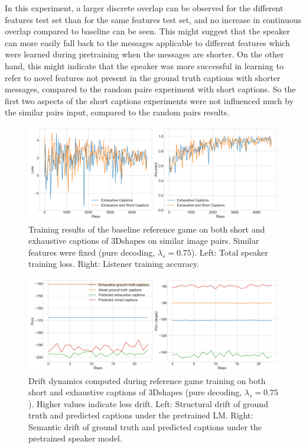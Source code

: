 In this experiment, a larger discrete overlap can be observed for the different features test set than for the same features test set, and no increase in continuous overlap compared to baseline can be seen. This might suggest that the speaker can more easily fall back to the messages applicable to different features which were learned during pretraining when the messages are shorter. On the other hand, this might indicate that the speaker was more successful in learning to refer to novel features not present in the ground truth captions with shorter messages, compared to the random pairs experiment with short captions. So the first two aspects of the short captions experiments were not influenced much by the similar pairs input, compared to the random pairs results.
\begin{figure}[h]
	\centering
	\includegraphics[width=\linewidth]{images/3dshapes_similarFixed_short_vs_exh_075_losses.png}
	\caption{Training results of the baseline reference game on both short and exhaustive captions of 3Dshapes on similar image pairs. Similar features were fixed (pure decoding, $\lambda_s=0.75$). Left: Total speaker training loss. Right: Listener training accuracy.}
	\label{fig:3dshapes_wShort_similarFixed_075_speaker_losses_listener_acc}
\end{figure}

\begin{figure}[h]
	\centering
	\includegraphics[width=\linewidth]{images/3dshapes_exh_short_structural_semantic_drift_49_pure_075_similarFixed.png}
	\caption{Drift dynamics computed during reference game training on both short and exhaustive captions of 3Dshapes (pure decoding, $\lambda_s=0.75$). Higher values indicate less drift. Left: Structural drift of ground truth and predicted captions under the pretrained LM. Right: Semantic drift of ground truth and predicted captions under the pretrained speaker model.}
	\label{fig:3dshapes_wShort_similarFixed_075_str_sem_drift}
\end{figure}

